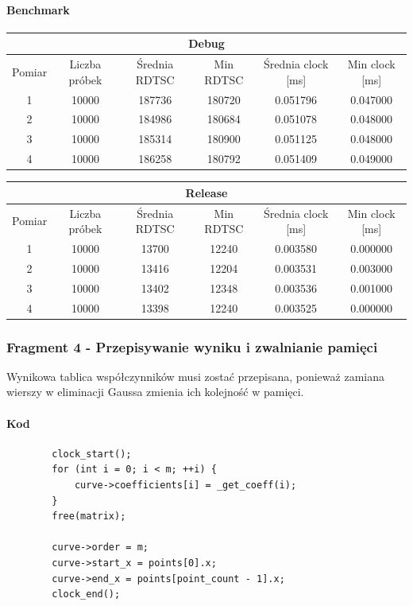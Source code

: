 \documentclass{article}
\begin{document}
	\paragraph{Benchmark}
	\begin{center}
		\begin{tabular}{|c|c|c|c|c|c|} \hline
			\multicolumn{6}{|c|}{Debug} \\\hline
			Pomiar  & Liczba próbek & Średnia RDTSC & Min RDTSC & Średnia clock [ms] & Min clock [ms] \\\hline
			\hline
			1 & 10000 & 187736 & 180720 & 0.051796 & 0.047000 \\\hline
			2 & 10000 & 184986 & 180684 & 0.051078 & 0.048000 \\\hline
			3 & 10000 & 185314 & 180900 & 0.051125 & 0.048000 \\\hline
			4 & 10000 & 186258 & 180792 & 0.051409 & 0.049000 \\\hline
			
		\end{tabular}
	\end{center}
	\begin{center}
		\begin{tabular}{|c|c|c|c|c|c|} \hline
			\multicolumn{6}{|c|}{Release} \\\hline
			Pomiar  & Liczba próbek & Średnia RDTSC & Min RDTSC & Średnia clock [ms] & Min clock [ms] \\\hline
			\hline
			1 & 10000 & 13700 & 12240 & 0.003580 & 0.000000 \\\hline
			2 & 10000 & 13416 & 12204 & 0.003531 & 0.003000 \\\hline
			3 & 10000 & 13402 & 12348 & 0.003536 & 0.001000 \\\hline
			4 & 10000 & 13398 & 12240 & 0.003525 & 0.000000 \\\hline
			
		\end{tabular}
	\end{center}
	

	
	\pagebreak
	\subsubsection{Fragment 4 - Przepisywanie wyniku i zwalnianie pamięci}
	Wynikowa tablica współczynników musi zostać przepisana, ponieważ zamiana wierszy w eliminacji Gaussa zmienia ich kolejność w pamięci.
	\paragraph{Kod}
	\begin{verbatim}
		clock_start();
		for (int i = 0; i < m; ++i) {
			curve->coefficients[i] = _get_coeff(i);
		}
		free(matrix);
		
		curve->order = m;
		curve->start_x = points[0].x;
		curve->end_x = points[point_count - 1].x;
		clock_end();
	\end{verbatim}
	
\end{document}
